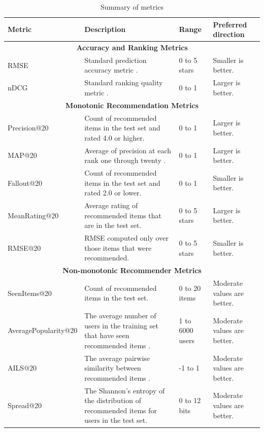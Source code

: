 \documentclass[letterpaper]{sig-alternate}
\begin{document}
  \begin{table}[ht!]
    \centering
    \begin{tabular}{|p{7.5em}|p{21em}|p{7em}|p{12.5em}|}
      \hline
      Metric & Description & Range & Preferred direction\\\hline
      \hline
      \multicolumn{4}{|c|}{{\bf Accuracy and Ranking Metrics}} \\\hline
      RMSE                   & Standard prediction accuracy metric \cite{handbook}. & 0 to 5 stars & Smaller is better. \\\hline
      nDCG                   & Standard ranking quality metric \cite{handbook}.     & 0 to 1       & Larger is better.  \\\hline
      \hline
      \multicolumn{4}{|c|}{{\bf Monotonic Recommendation Metrics}} \\\hline
      Precision@20           & Count of recommended items in the test set and rated 4.0 or higher\footnotemark[1] \cite{handbook}.   & 0 to 1       & Larger is better.  \\\hline
      MAP@20                 & Average of precision at each rank one through twenty \cite{manning2008introduction}.                  & 0 to 1       & Larger is better.  \\\hline
      Fallout@20             & Count of recommended items in the test set and rated 2.0 or lower\footnotemark[1] \cite{TenIsEnough}. & 0 to 1       & Smaller is better. \\\hline
      MeanRating@20          & Average rating of recommended items that are in the test set.                                         & 0 to 5 stars & Larger is better.  \\\hline
      RMSE@20                & RMSE computed only over those items that were recommended.                                            & 0 to 5 stars & Smaller is better. \\\hline
      \hline
      \multicolumn{4}{|c|}{{\bf Non-monotonic Recommender Metrics}} \\\hline
      SeenItems@20           & Count of recommended items in the test set. & 0 to 20 items & Moderate values are better. \\\hline
      Average\-Popularity@20 & The average number of users in the training set that have seen recommended items \cite{zieglerDiversity}.& 1 to 6000 users & Moderate values are better. \\\hline
      AILS@20                & The average pairwise similarity between recommended items \cite{zieglerDiversity}.                       & -1 to 1         & Moderate values are better. \\\hline
      Spread@20              & The Shannon's entropy of the distribution of recommended items for users in the test set.                & 0 to 12 bits    & Moderate values are better. \\\hline
    \end{tabular}
    \caption{Summary of metrics}
    \label{tbl:metrics}
  \end{table}
\end{document}

